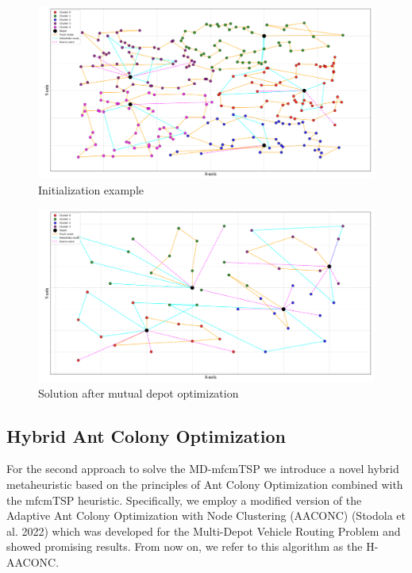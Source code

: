 \documentclass{article}
\begin{document}
	\begin{figure}[h]
		\caption[width=\textwidth]{Initialization example}
		\includegraphics[width=\textwidth]{Initialization_example_p11}
		\centering
	\end{figure}
	\begin{figure}[h]
		\caption[width=\textwidth]{Solution after mutual depot optimization}
		\includegraphics[width=\textwidth]{solution_p01_prox}
		\centering
	\end{figure}
	\clearpage
	\subsection{Hybrid Ant Colony Optimization}
	For the second approach to solve the MD-mfcmTSP we introduce a novel hybrid metaheuristic based on the principles of Ant Colony Optimization combined with the mfcmTSP heuristic. Specifically, we employ a modified version of the Adaptive Ant Colony Optimization with Node Clustering (AACONC) (Stodola et al. 2022) which was developed for the Multi-Depot Vehicle Routing Problem and showed promising results. From now on, we refer to this algorithm as the H-AACONC.
	\par 
\end{document}
